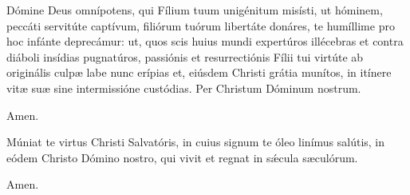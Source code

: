 
Dómine Deus omnípotens,
qui Fílium tuum unigénitum misísti,
ut hóminem, peccáti servitúte captívum,
filiórum tuórum libertáte donáres,
te humíllime pro hoc infánte deprecámur:
ut, quos scis huius mundi expertúros illécebras
et contra diáboli insídias pugnatúros,
passiónis et resurrectiónis Fílii tui virtúte
ab originális culpæ labe nunc erípias
et, eiúsdem Christi grátia munítos,
in itínere vitæ suæ sine intermissióne custódias.
Per Christum Dóminum nostrum.

 Amen.


Múniat te virtus Christi Salvatóris,
in cuius signum te óleo linímus salútis,
in eódem Christo Dómino nostro,
qui vivit et regnat in sǽcula sæculórum.

 Amen.

